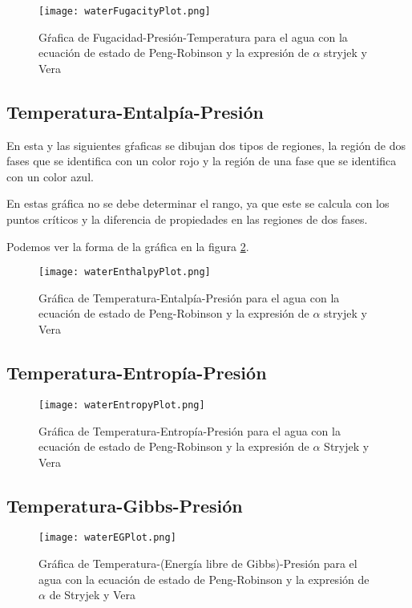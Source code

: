 		\begin{figure}[!h]
			\texttt{[image: waterFugacityPlot.png]}
			\caption{Gŕafica de Fugacidad-Presión-Temperatura para el agua con la ecuación de estado de Peng-Robinson y la expresión de $\alpha$ stryjek y Vera}
			\label{fig:fugplot}
		\end{figure}
	\subsection{Temperatura-Entalpía-Presión}\label{subsec:tep}

		En esta y las siguientes gŕaficas se dibujan dos tipos de regiones, la región de dos fases que se identifica con un color rojo y la región de una fase que se identifica con un color azul.

		En estas gráfica no se debe determinar el rango, ya que este se calcula con los puntos críticos y la diferencia de propiedades en las regiones de dos fases. 

		Podemos ver la forma de la gráfica en la figura \ref{fig:hplot}.

		\begin{figure}[!h]
			\texttt{[image: waterEnthalpyPlot.png]}
			\caption{Gráfica de Temperatura-Entalpía-Presión para el agua con la ecuación de estado de Peng-Robinson y la expresión de $\alpha$ stryjek y Vera}
			\label{fig:hplot}
		\end{figure}
	\subsection{Temperatura-Entropía-Presión}\label{subsec:tsp}	
		\begin{figure}[H]
			\texttt{[image: waterEntropyPlot.png]}
			\caption{Gráfica de Temperatura-Entropía-Presión para el agua con la ecuación de estado de Peng-Robinson y la expresión de $\alpha$ Stryjek y Vera}
			\label{fig:splot}
		\end{figure}
	\subsection{Temperatura-Gibbs-Presión}\label{subsec:tgp}
		\begin{figure}[H]
			\texttt{[image: waterEGPlot.png]}
			\caption{Gráfica de Temperatura-(Energía libre de Gibbs)-Presión para el agua con la ecuación de estado de Peng-Robinson y la expresión de $\alpha$ de Stryjek y Vera}
			\label{gplot}
		\end{figure}

